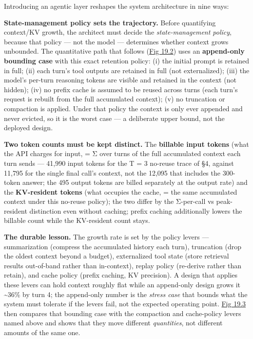 \label{architecture-consequence}


Introducing an agentic layer reshapes the system architecture in nine
ways:

\textbf{State-management policy sets the trajectory.} Before quantifying
context/KV growth, the architect must decide the \emph{state-management
policy}, because that policy --- not the model --- determines whether
context grows unbounded. The quantitative path that follows (\hyperref[fig:19.2]{Fig 19.2})
uses an \textbf{append-only bounding case} with this exact retention
policy: (i) the initial prompt is retained in full; (ii) each turn's
tool outputs are retained in full (not externalized); (iii) the model's
per-turn reasoning tokens are visible and retained in the context (not
hidden); (iv) no prefix cache is assumed to be reused across turns (each
turn's request is rebuilt from the full accumulated context); (v) no
truncation or compaction is applied. Under that policy the context is
only ever appended and never evicted, so it is the worst case --- a
deliberate upper bound, not the deployed design.

\textbf{Two token counts must be kept distinct.} The \textbf{billable
input tokens} (what the API charges for input, = Σ over turns of the
full accumulated context each turn sends --- 41,990 input tokens for the
T = 3 no-reuse trace of §4, against 11,795 for the single final call's
context, not the 12,095 that includes the 300-token answer; the 495
output tokens are billed separately at the output rate) and the
\textbf{KV-resident tokens} (what occupies the cache, = the same
accumulated context under this no-reuse policy); the two differ by the
Σ-per-call vs peak-resident distinction even without caching; prefix
caching additionally lowers the billable count while the KV-resident
count stays.

\textbf{The durable lesson.} The growth rate is set by the policy levers
--- summarization (compress the accumulated history each turn),
truncation (drop the oldest context beyond a budget), externalized tool
state (store retrieval results out-of-band rather than in-context),
replay policy (re-derive rather than retain), and cache policy (prefix
caching, KV precision). A design that applies these levers can hold
context roughly flat while an append-only design grows it
\textasciitilde36\% by turn 4; the append-only number is the
\emph{stress case} that bounds what the system must tolerate if the
levers fail, not the expected operating point. \hyperref[fig:19.3]{Fig 19.3} then compares
that bounding case with the compaction and cache-policy levers named
above and shows that they move different \emph{quantities}, not
different amounts of the same one.

